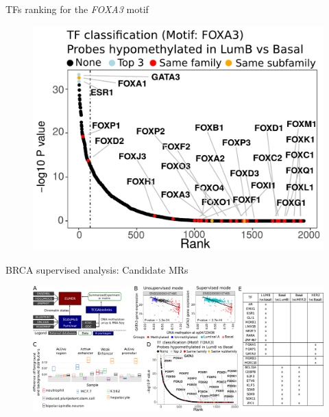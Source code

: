 \documentclass[slidestop,compress,11pt,xcolor=dvipsnames]{beamer}
\begin{document}
\begin{frame}{TFs ranking for the \textit{FOXA3} motif}
 \vspace*{-0.4cm}
 \begin{figure}
  \centering
  \includegraphics[width=0.9\linewidth]{ELMER/painel_D.pdf}
   \end{figure}
\end{frame}

\begin{frame}{BRCA supervised analysis: Candidate MRs}
 \vspace*{-0.4cm}
 \begin{figure}
  \centering
  \includegraphics[width=0.48\linewidth]{ELMER/painel_E.pdf} \end{figure}
\end{frame}




\end{document}

